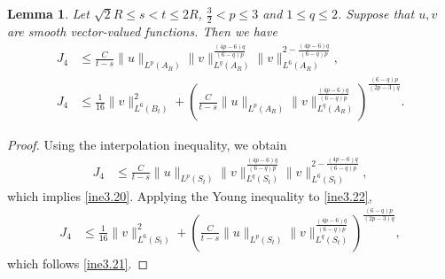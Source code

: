 \documentclass[11pt,reqno]{amsart}
\newtheorem{Lem}{Lemma}[section]
\numberwithin{Thm}{section}
\begin{document}
\begin{Lem}\label{Lem3.5}
Let $\sqrt{2}R\leq s<t\leq 2R$, $\frac{3}{2}<p\leq3$ and $1\leq q\leq2$. Suppose that $u,v$ are smooth vector-valued functions. Then we have
\begin{align}
J_4&\leq \frac{C}{t-s}\|u\|_{L^p(A_R)}\|v\|_{L^q(A_R)}^\frac{(4p-6)q}{(6-q)p}\|v\|_{L^6(A_R)}^{2-\frac{(4p-6)q}{(6-q)p}},\label{ine3.20}\\
J_4&\leq \frac{1}{16}\|v\|_{L^6(B_t)}^2+\left(\frac{C}{t-s}\|u\|_{L^p(A_R)}\|v\|_{L^q(A_R)}^\frac{(4p-6)q}{(6-q)p}\right)^\frac{(6-q)p}{(2p-3)q}.\label{ine3.21}
\end{align}
\end{Lem}
\begin{proof}
Using the interpolation inequality, we obtain
\begin{align}\label{ine3.22}
J_4&\leq \frac{C}{t-s}\|u\|_{L^p(S_t)}\|v\|_{L^q(S_t)}^\frac{(4p-6)q}{(6-q)p}\|v\|_{L^6(S_t)}^{2-\frac{(4p-6)q}{(6-q)p}},
\end{align}
which implies \eqref{ine3.20}. Applying the Young inequality to \eqref{ine3.22},
\begin{align*}
J_4&\leq \frac{1}{16}\|v\|_{L^6(S_t)}^2+\left(\frac{C}{t-s}\|u\|_{L^p(S_t)}\|v\|_{L^q(S_t)}^\frac{(4p-6)q}{(6-q)p}\right)^\frac{(6-q)p}{(2p-3)q},
\end{align*}
which follows \eqref{ine3.21}.
\end{proof}
\end{document}
